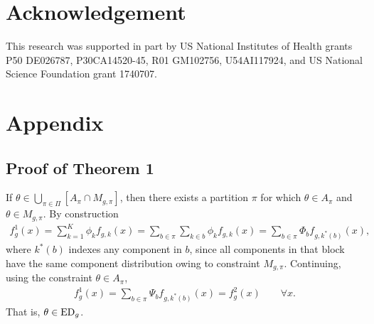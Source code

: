 \documentclass[aoas,preprint]{imsart}
\begin{document}
\section*{Acknowledgement}
This research was supported in part by US National Institutes of Health grants 
P50 DE026787, P30CA14520-45, R01 GM102756, U54AI117924, 
and US  National Science Foundation grant 1740707.

%



\newpage

\renewcommand{\tablename}{Appendix Table}
\renewcommand{\thetable}{A\arabic{table}}
\section*{Appendix}

\subsection*{Proof of Theorem 1}

If $\theta \in \bigcup_{\pi \in \Pi} \left[ A_{\pi} \cap M_{g, \pi} \right]$, then there exists a partition $\pi$
for which $\theta \in A_\pi$ and $\theta \in M_{g,\pi}$.   By construction
\begin{eqnarray*}
f^1_g(x) = \sum_{k=1}^K \phi_k f_{g,k}(x) 
         = \sum_{b \in \pi} \sum_{k \in b} \phi_k f_{g,k}(x) 
         = \sum_{b \in \pi} \Phi_b f_{g,k^*(b)}(x) ,
\end{eqnarray*}
where $k^*(b)$ indexes any component in $b$, since all components in that block have the same component distribution
owing to constraint $M_{g,\pi}$. Continuing, using the constraint $\theta \in A_{\pi}$,
\begin{eqnarray*}
f^1_g(x) = \sum_{b \in \pi} \Psi_b f_{g,k^*(b)}(x) = f^2_g(x)   \qquad \forall x.
\end{eqnarray*}
That is, $\theta \in {\mbox {\rm ED}}_g$.
\end{document}
